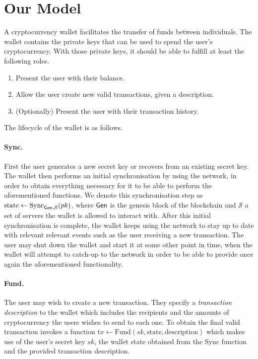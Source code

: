 \section{Our Model}
\label{model}
A cryptocurrency wallet facilitates the transfer of funds between individuals. The wallet contains the private keys that can be used to spend the user's cryptocurrency. With those private keys, it should be able to fulfill at least the following roles.

\begin{enumerate}
    \item Present the user with their balance.
    \item Allow the user create new valid transactions, given a description.
    \item (Optionally) Present the user with their transaction history.
\end{enumerate}

The lifecycle of the wallet is as follows.
\paragraph{Sync.}
First the user generates a new secret key or recovers from an existing secret key. The wallet then performs an initial synchronisation by using the network, in order to obtain everything necessary for it to be able to perform the aforementioned functions. We denote this synchronisation step as $\text{state} \gets \text{Sync}_{\textsf{Gen}, \mathcal{S}}(pk)$, where $\textsf{Gen}$ is the genesis block of the blockchain and $\mathcal{S}$ a set of servers the wallet is allowed to interact with. After this initial synchronisation is complete, the wallet keeps using the network to stay up to date with relevant relevant events such as the user receiving a new transaction. The user may shut down the wallet and start it at some other point in time, when the wallet will attempt to catch-up to the network in order to be able to provide once again the aforementioned functionality.

\paragraph{Fund.}
The user may wish to create a new transaction. They specify a \emph{transaction description} to the wallet which includes the recipients and the amounts of cryptocurrency the users wishes to send to each one. To obtain the final valid transaction invokes a function $tx \gets \text{Fund}(sk, \text{state}, \text{description})$ which makes use of the user's secret key $sk$, the wallet state obtained from the Sync function and the provided transaction description.

